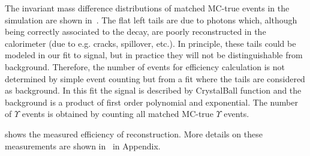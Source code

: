 The invariant mass difference distributions of matched MC-true events in the
\chib simulation are shown in~. The flat left tails
are due to photons which, although being correctly associated to the \chib decay,
are poorly reconstructed in the calorimeter (due to e.g. cracks, spillover,
etc.). In principle, these tails could be modeled in our fit to signal, but in
practice they will not be distinguishable from background. Therefore, the
number of \chib events for efficiency calculation is not determined by simple
event counting but from a fit where the tails are considered as background. In
this fit the signal is described by CrystalBall function and the background is
a product of first order polynomial and exponential. The number of $\Upsilon$
events is obtained by counting all matched MC-true $\Upsilon$ events.



 shows the measured efficiency of \chib reconstruction.
More details on these measurements are shown
in~ in Appendix.


